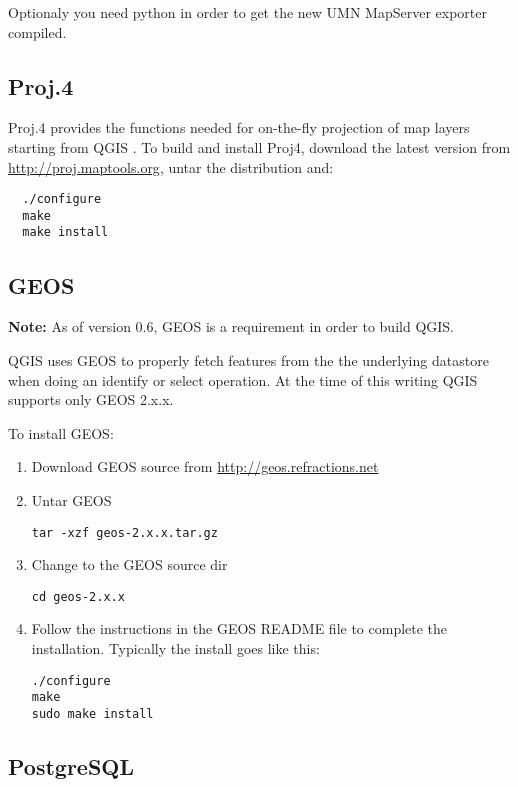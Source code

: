 Optionaly you need python in order to get the new UMN MapServer exporter
compiled.

%
%
\subsection{Proj.4}\label{label_proj4}

Proj.4 provides the functions needed for on-the-fly projection of map layers
starting from QGIS \OLD. To build and install Proj4, download the latest version
from \url{http://proj.maptools.org}, untar the distribution and:

\begin{verbatim}
  ./configure
  make
  make install
\end{verbatim}

%
%
\subsection{GEOS}\label{label_geos}

\textbf{Note:} As of version 0.6, GEOS is a requirement in order to build
QGIS.

QGIS uses GEOS to properly fetch features from the the underlying
datastore when doing an identify or select operation. At the time of this 
writing QGIS \CURRENT supports only GEOS 2.x.x.

To install GEOS:
  
\begin{enumerate}
\item Download GEOS source from \url{http://geos.refractions.net} \cite{GEOSweb}
\item Untar GEOS
\begin{verbatim}
tar -xzf geos-2.x.x.tar.gz
\end{verbatim}
\item Change to the GEOS source dir
\begin{verbatim}
cd geos-2.x.x
\end{verbatim}
\item Follow the instructions in the GEOS README file to complete the
installation. Typically the install goes like this:
\begin{verbatim}
./configure
make
sudo make install
\end{verbatim}

\end{enumerate}


%
%
\subsection{PostgreSQL}\label{label_postgresql}

